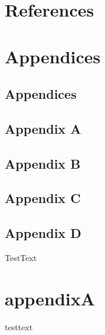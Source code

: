 \documentclass[
  letterpaper,
]{book}
\begin{document}

\chapter*{References}\label{references}


\label{refs}

\cleardoublepage
{}
{}
\appendix

\chapter{Appendices}\label{appendices-1}

\section{Appendices}\label{appendices-2}

\section{Appendix A}\label{appendix-a}

\section{Appendix B}\label{appendix-b}

\section{Appendix C}\label{appendix-c}

\section{Appendix D}\label{appendix-d}

TestText

\chapter{appendixA}\label{appendixa}

testtext


\backmatter


\clearpage
\thispagestyle{empty} %

\newpage
\end{document}
